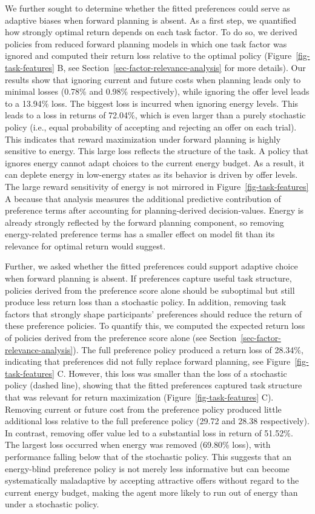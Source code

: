 \documentclass[
  letterpaper,
  DIV=11,
  numbers=noendperiod]{scrartcl}
\begin{document}
We further sought to determine whether the fitted preferences could
serve as adaptive biases when forward planning is absent. As a first
step, we quantified how strongly optimal return depends on each task
factor. To do so, we derived policies from reduced forward planning
models in which one task factor was ignored and computed their return
loss relative to the optimal policy (Figure~\ref{fig-task-features} B,
see Section~\ref{sec-factor-relevance-analysis} for more details). Our
results show that ignoring current and future costs when planning leads
only to minimal losses (0.78\% and 0.98\% respectively), while ignoring
the offer level leads to a 13.94\% loss. The biggest loss is incurred
when ignoring energy levels. This leads to a loss in returns of 72.04\%,
which is even larger than a purely stochastic policy (i.e., equal
probability of accepting and rejecting an offer on each trial). This
indicates that reward maximization under forward planning is highly
sensitive to energy. This large loss reflects the structure of the task.
A policy that ignores energy cannot adapt choices to the current energy
budget. As a result, it can deplete energy in low-energy states as its
behavior is driven by offer levels. The large reward sensitivity of
energy is not mirrored in Figure~\ref{fig-task-features} A because that
analysis measures the additional predictive contribution of preference
terms after accounting for planning-derived decision-values. Energy is
already strongly reflected by the forward planning component, so
removing energy-related preference terms has a smaller effect on model
fit than its relevance for optimal return would suggest.

Further, we asked whether the fitted preferences could support adaptive
choice when forward planning is absent. If preferences capture useful
task structure, policies derived from the preference score alone should
be suboptimal but still produce less return loss than a stochastic
policy. In addition, removing task factors that strongly shape
participants' preferences should reduce the return of these preference
policies. To quantify this, we computed the expected return loss of
policies derived from the preference score alone (see
Section~\ref{sec-factor-relevance-analysis}). The full preference policy
produced a return loss of 28.34\%, indicating that preferences did not
fully replace forward planning, see Figure~\ref{fig-task-features} C.
However, this loss was smaller than the loss of a stochastic policy
(dashed line), showing that the fitted preferences captured task
structure that was relevant for return maximization
(Figure~\ref{fig-task-features} C). Removing current or future cost from
the preference policy produced little additional loss relative to the
full preference policy (29.72 and 28.38 respectively). In contrast,
removing offer value led to a substantial loss in return of 51.52\%. The
largest loss occurred when energy was removed (69.80\% loss), with
performance falling below that of the stochastic policy. This suggests
that an energy-blind preference policy is not merely less informative
but can become systematically maladaptive by accepting attractive offers
without regard to the current energy budget, making the agent more
likely to run out of energy than under a stochastic policy.
\end{document}
